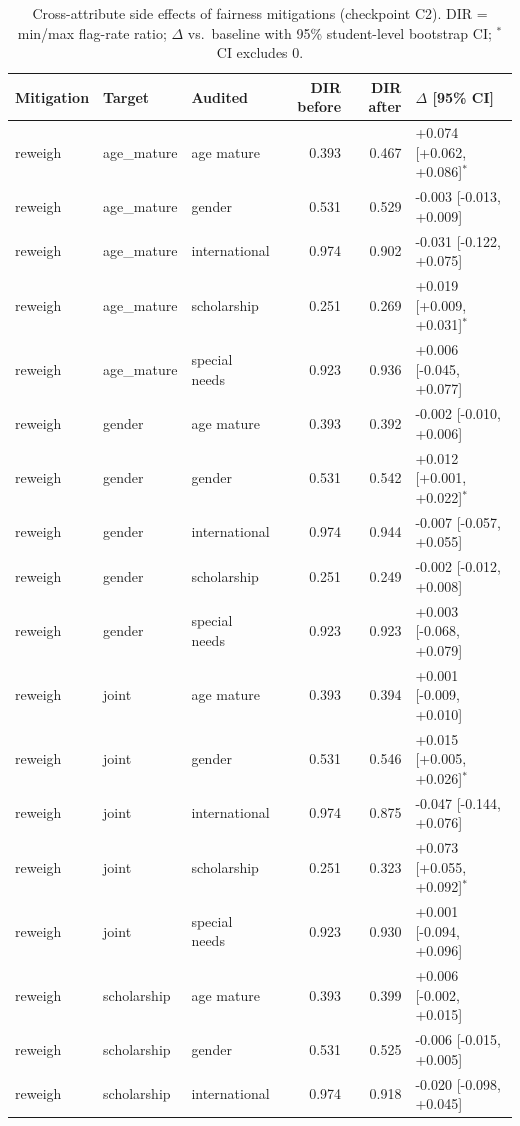 \begin{table}[t]
\centering
\small
\caption{Cross-attribute side effects of fairness mitigations (checkpoint C2). DIR = min/max flag-rate ratio; $\Delta$ vs.\ baseline with 95\% student-level bootstrap CI; $^{*}$ CI excludes 0.}
\label{tab:uci697_side_effects}
\begin{tabular}{lllrrl}
\toprule
Mitigation & Target & Audited & DIR before & DIR after & $\Delta$ [95\% CI] \\
\midrule
reweigh & age_mature & age mature & 0.393 & 0.467 & +0.074 [+0.062, +0.086]$^{*}$ \\
reweigh & age_mature & gender & 0.531 & 0.529 & -0.003 [-0.013, +0.009] \\
reweigh & age_mature & international & 0.974 & 0.902 & -0.031 [-0.122, +0.075] \\
reweigh & age_mature & scholarship & 0.251 & 0.269 & +0.019 [+0.009, +0.031]$^{*}$ \\
reweigh & age_mature & special needs & 0.923 & 0.936 & +0.006 [-0.045, +0.077] \\
reweigh & gender & age mature & 0.393 & 0.392 & -0.002 [-0.010, +0.006] \\
reweigh & gender & gender & 0.531 & 0.542 & +0.012 [+0.001, +0.022]$^{*}$ \\
reweigh & gender & international & 0.974 & 0.944 & -0.007 [-0.057, +0.055] \\
reweigh & gender & scholarship & 0.251 & 0.249 & -0.002 [-0.012, +0.008] \\
reweigh & gender & special needs & 0.923 & 0.923 & +0.003 [-0.068, +0.079] \\
reweigh & joint & age mature & 0.393 & 0.394 & +0.001 [-0.009, +0.010] \\
reweigh & joint & gender & 0.531 & 0.546 & +0.015 [+0.005, +0.026]$^{*}$ \\
reweigh & joint & international & 0.974 & 0.875 & -0.047 [-0.144, +0.076] \\
reweigh & joint & scholarship & 0.251 & 0.323 & +0.073 [+0.055, +0.092]$^{*}$ \\
reweigh & joint & special needs & 0.923 & 0.930 & +0.001 [-0.094, +0.096] \\
reweigh & scholarship & age mature & 0.393 & 0.399 & +0.006 [-0.002, +0.015] \\
reweigh & scholarship & gender & 0.531 & 0.525 & -0.006 [-0.015, +0.005] \\
reweigh & scholarship & international & 0.974 & 0.918 & -0.020 [-0.098, +0.045] \\

\end{tabular}
\end{table}
